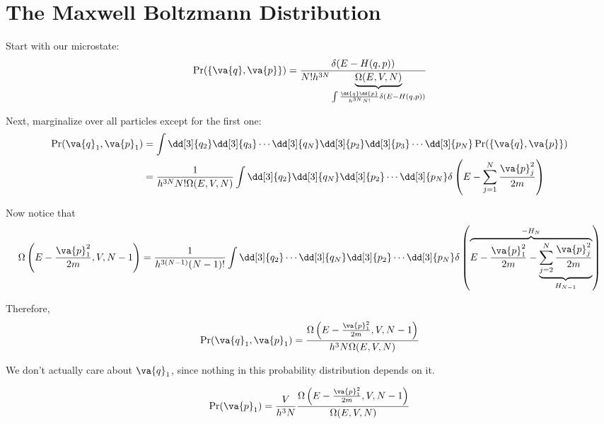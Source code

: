 \documentclass[a4paper,twoside,master.tex]{subfiles}
\begin{document}

\section{The Maxwell Boltzmann Distribution}
\label{sec:the_maxwell_boltzmann_distribution}

Start with our microstate:
\begin{equation}
    \Pr(\{\va{q}, \va{p}\}) = \frac{\delta(E - H(q, p))}{N! h^{3N} \underbrace{\Omega(E,V,N)}_{\int \frac{\dd{q} \dd{p}}{h^{3N} N!} \delta(E-H(q, p))}}
\end{equation}

Next, marginalize over all particles except for the first one:
\begin{align}
    \Pr(\va{q}_1, \va{p}_1) &= \int \dd[3]{q_2} \dd[3]{q_3} \cdots \dd[3]{q_N} \dd[3]{p_2} \dd[3]{p_3} \cdots \dd[3]{p_N} \Pr(\{\va{q}, \va{p}\}) \\
    &= \frac{1}{h^{3N} N! \Omega(E,V,N)} \int \dd[3]{q_2} \dd[3]{q_N} \dd[3]{p_2} \cdots \dd[3]{p_N} \delta\left( E - \sum_{j=1}^{N} \frac{\va{p}^2_j}{2m} \right)
\end{align}

Now notice that
\begin{equation}
    \Omega\left( E - \frac{\va{p}_1^2}{2m}, V, N-1 \right) = \frac{1}{h^{3(N-1)} (N-1)!} \int \dd[3]{q_2} \cdots \dd[3]{q_N} \dd[3]{p_2} \cdots \dd[3]{p_N} \delta\left( \overbrace{E - \frac{\va{p}_1^2}{2m} - \underbrace{\sum_{j=2}^{N} \frac{\va{p}_j^2}{2m}}_{H_{N-1}}}^{-H_N} \right)
\end{equation}

Therefore,
\begin{equation}
    \Pr(\va{q}_1, \va{p}_1) = \frac{\Omega\left( E - \frac{\va{p}^2_1}{2m}, V, N-1 \right)}{h^3 N \Omega(E, V, N)}
\end{equation}

We don't actually care about $ \va{q}_1 $, since nothing in this probability distribution depends on it.

\begin{equation}
    \Pr(\va{p}_1) = \frac{V}{h^3 N} \frac{\Omega\left( E - \frac{\va{p}_1^2}{2m}, V, N-1 \right)}{\Omega(E, V, N)}
\end{equation}
\end{document}
